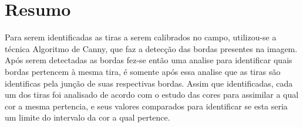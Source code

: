 
\chapter*{Resumo}

	 Para serem identificadas as tiras a serem calibrados no campo, utilizou-se a técnica Algoritmo de Canny, que faz a detecção das bordas presentes na imagem. Após serem detectadas as bordas fez-se então uma analise para identificar quais bordas pertencem à mesma tira, é somente após essa analise que as tiras são identificas pela junção de suas respectivas bordas. Assim que identificadas, cada um dos tiras foi analisado de acordo com o estudo das cores para assimilar a qual cor a mesma pertencia, e seus valores comparados para identificar se esta seria um limite do intervalo da cor a qual pertence.
